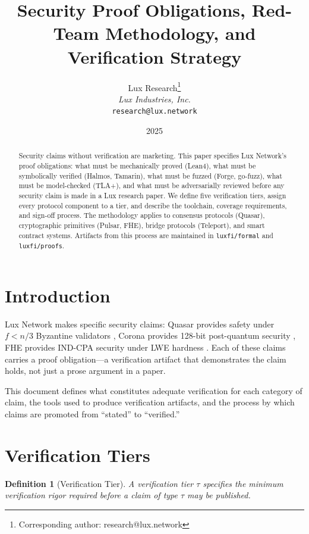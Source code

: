 \documentclass[11pt]{article}
\title{Security Proof Obligations, Red-Team Methodology, and Verification Strategy}
\author{
Lux Research\thanks{Corresponding author: research@lux.network}\\
\textit{Lux Industries, Inc.}\\
\texttt{research@lux.network}
}
\date{2025}
\newtheorem{definition}{Definition}
\begin{document}
\luxcoverpage

\begin{abstract}
Security claims without verification are marketing. This paper specifies Lux Network's proof obligations: what must be mechanically proved (Lean4), what must be symbolically verified (Halmos, Tamarin), what must be fuzzed (Forge, go-fuzz), what must be model-checked (TLA+), and what must be adversarially reviewed before any security claim is made in a Lux research paper. We define five verification tiers, assign every protocol component to a tier, and describe the toolchain, coverage requirements, and sign-off process. The methodology applies to consensus protocols (Quasar), cryptographic primitives (Pulsar, FHE), bridge protocols (Teleport), and smart contract systems. Artifacts from this process are maintained in \texttt{luxfi/formal} and \texttt{luxfi/proofs}.
\end{abstract}

\section{Introduction}

Lux Network makes specific security claims: Quasar provides safety under $f < n/3$ Byzantine validators \cite{quasar}, Corona provides 128-bit post-quantum security \cite{corona}, FHE provides IND-CPA security under LWE hardness \cite{tfhe}. Each of these claims carries a proof obligation---a verification artifact that demonstrates the claim holds, not just a prose argument in a paper.

This document defines what constitutes adequate verification for each category of claim, the tools used to produce verification artifacts, and the process by which claims are promoted from ``stated'' to ``verified.''

\section{Verification Tiers}

\begin{definition}[Verification Tier]
A verification tier $\tau$ specifies the minimum verification rigor required before a claim of type $\tau$ may be published.
\end{definition}
\end{document}
